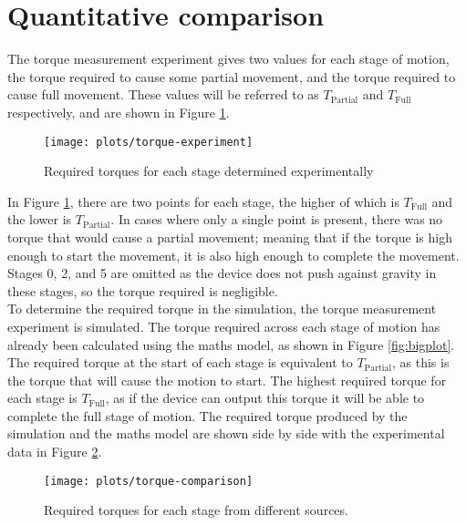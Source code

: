 \section{Quantitative comparison}

The torque measurement experiment gives two values for each stage of motion, the torque required to cause some partial movement, and the torque required to cause full movement. These values will be referred to as $T_\mathrm{Partial}$ and $T_\mathrm{Full}$ respectively, and are shown in Figure \ref{fig:torque-experiment}.\\

\begin{figure}[!h]
	\centering
	\texttt{[image: plots/torque-experiment]}
	\caption{Required torques for each stage determined experimentally}
	\label{fig:torque-experiment}
\end{figure}

In Figure \ref{fig:torque-experiment}, there are two points for each stage, the higher of which is $T_\mathrm{Full}$ and the lower is $T_\mathrm{Partial}$. In cases where only a single point is present, there was no torque that would cause a partial movement; meaning that if the torque is high enough to start the movement, it is also high enough to complete the movement. Stages 0, 2, and 5 are omitted as the device does not push against gravity in these stages, so the torque required is negligible.\\

To determine the required torque in the simulation, the torque measurement experiment is simulated. The torque required across each stage of motion has already been calculated using the maths model, as shown in Figure \ref{fig:bigplot}. The required torque at the start of each stage is equivalent to $T_\mathrm{Partial}$, as this is the torque that will cause the motion to start. The highest required torque for each stage is $T_\mathrm{Full}$, as if the device can output this torque it will be able to complete the full stage of motion. The required torque produced by the simulation and the maths model are shown side by side with the experimental data in Figure \ref{fig:torque-comparison}.\\

\begin{figure}[!h]
	\centering
	\texttt{[image: plots/torque-comparison]}
	\caption{Required torques for each stage from different sources.}
	\label{fig:torque-comparison}
\end{figure}

